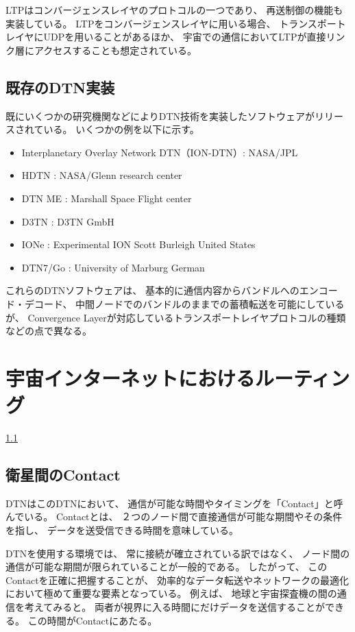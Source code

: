 LTP\cite{rfc5326}はコンバージェンスレイヤのプロトコルの一つであり、 再送制御の機能も実装している。
LTPをコンバージェンスレイヤに用いる場合、 トランスポートレイヤにUDPを用いることがあるほか、 
宇宙での通信においてLTPが直接リンク層にアクセスすることも想定されている。
\subsection{既存のDTN実装}
既にいくつかの研究機関などによりDTN技術を実装したソフトウェアがリリースされている。 いくつかの例を以下に示す。 

\begin{itemize}
    \item Interplanetary Overlay Network DTN（ION-DTN）: NASA/JPL
    \item HDTN : NASA/Glenn research center
    \item DTN ME : Marshall Space Flight center
    \item \textmu D3TN : D3TN GmbH
    \item IONe : Experimental ION Scott Burleigh United States 
    \item DTN7/Go : University of Marburg German
\end{itemize}

これらのDTNソフトウェアは、 基本的に通信内容からバンドルへのエンコード・デコード、 
中間ノードでのバンドルのままでの蓄積転送を可能にしているが、 
Convergence Layerが対応しているトランスポートレイヤプロトコルの種類などの点で異なる。 


\section{宇宙インターネットにおけるルーティング}
\ref{}
\subsection{衛星間のContact}
DTNはこのDTNにおいて、
通信が可能な時間やタイミングを「Contact」と呼んでいる。 Contactとは、 
２つのノード間で直接通信が可能な期間やその条件を指し、 データを送受信できる時間を意味している。

DTNを使用する環境では、 常に接続が確立されている訳ではなく、 ノード間の通信が可能な期間が限られていることが一般的である。
したがって、 このContactを正確に把握することが、 効率的なデータ転送やネットワークの最適化において極めて重要な要素となっている。
例えば、 地球と宇宙探査機の間の通信を考えてみると。 両者が視界に入る時間にだけデータを送信することができる。 この時間がContactにあたる。 

